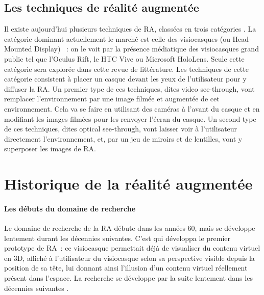 \subsection*{Les techniques de réalité augmentée}
Il existe aujourd'hui plusieurs techniques de RA, classées en trois catégories . La catégorie dominant actuellement le marché est celle des visiocasques (ou \foreignlanguage{english}{Head-Mounted Display}) \citep{VanKrevelenPoelman2010}~: on le voit par la présence médiatique des visiocasques grand public tel que l'Oculus Rift, le HTC Vive ou Microsoft HoloLens. Seule cette catégorie sera explorée dans cette revue de littérature. Les techniques de cette catégorie consistent à placer un casque devant les yeux de l'utilisateur pour y diffuser la RA. Un premier type de ces techniques, dites \foreignlanguage{english}{video see-through}, vont remplacer l'environnement par une image filmée et augmentée de cet environnement. Cela va se faire en utilisant des caméras à l'avant du casque et en modifiant les images filmées pour les renvoyer l'écran du casque. Un second type de ces techniques, dites \foreignlanguage{english}{optical see-through}, vont laisser voir à l'utilisateur directement l'environnement, et, par un jeu de miroirs et de lentilles, vont y superposer les images de RA.


\section*{Historique de la réalité augmentée}
\paragraph*{Les débuts du domaine de recherche}
Le domaine de recherche de la RA débute dans les années 60, mais se développe lentement durant les décennies suivantes. C'est \citet{Sutherland1968} qui développa le premier prototype de RA~: ce visiocasque permettait déjà de visualiser du contenu virtuel en 3D, affiché à l'utilisateur du visiocasque selon sa perspective visible depuis la position de sa tête, lui donnant ainsi l'illusion d'un contenu virtuel réellement présent dans l'espace. La recherche se développe par la suite lentement dans les décennies suivantes \citep{VanKrevelenPoelman2010} \citep{CarmignianiFurhtAnisettiEtAl2011}.


